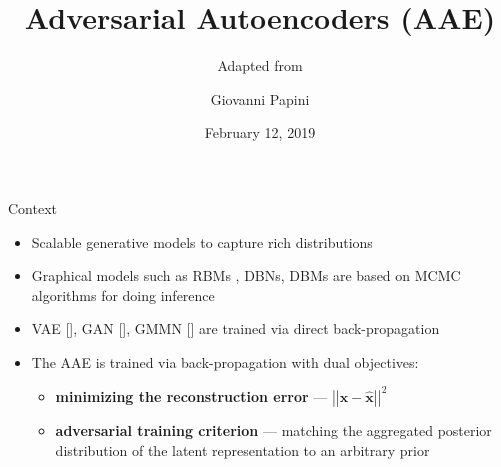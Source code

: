 \documentclass[10pt]{beamer}
\newcommand{\vect}[1]{\boldsymbol{#1}} %
\begin{document}
\author{Giovanni Papini}
\title{Adversarial Autoencoders (AAE)}
\subtitle{Adapted from \cite{makhzani2015adversarial}}
\date{February 12, 2019}
\subject{autoencoders, neural network, AI}

\begin{frame}[plain]
\maketitle
\end{frame}


\begin{frame}{Context}
\begin{itemize}
  \item Scalable generative models to capture rich distributions
  \item Graphical models such as RBMs , DBNs, DBMs are based on MCMC algorithms for doing inference
  \item VAE [\cite{kingma2013auto}], GAN [\cite{goodfellow2014generative}], GMMN [\cite{li2015generative}] are trained via direct back-propagation
  \item The AAE is trained via back-propagation with dual objectives:
  \begin{itemize}
    \item \textbf{minimizing the reconstruction error} — $ \left|\left|\vect x - \hat{\vect x}\right|\right| ^2 $
    \item \textbf{adversarial training criterion} — matching the aggregated posterior distribution of the latent representation to an arbitrary prior
  \end{itemize}
\end{itemize}
\end{frame}
\end{document}

